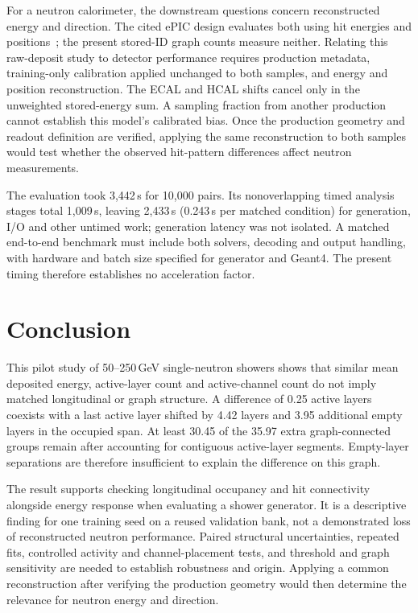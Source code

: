 \documentclass[10pt]{article}
\begin{document}
For a neutron calorimeter, the downstream questions concern reconstructed energy and direction. The cited ePIC design evaluates both using hit energies and positions~\cite{epiczdc}; the present stored-ID graph counts measure neither. Relating this raw-deposit study to detector performance requires production metadata, training-only calibration applied unchanged to both samples, and energy and position reconstruction. The ECAL and HCAL shifts cancel only in the unweighted stored-energy sum. A sampling fraction from another production cannot establish this model's calibrated bias. Once the production geometry and readout definition are verified, applying the same reconstruction to both samples would test whether the observed hit-pattern differences affect neutron measurements.

The evaluation took 3,442\,s for 10,000 pairs. Its nonoverlapping timed analysis stages total 1,009\,s, leaving 2,433\,s (0.243\,s per matched condition) for generation, I/O and other untimed work; generation latency was not isolated. A matched end-to-end benchmark must include both solvers, decoding and output handling, with hardware and batch size specified for generator and Geant4. The present timing therefore establishes no acceleration factor.

\section{Conclusion}

This pilot study of 50--250\,GeV single-neutron showers shows that similar mean deposited energy, active-layer count and active-channel count do not imply matched longitudinal or graph structure. A difference of 0.25 active layers coexists with a last active layer shifted by 4.42 layers and 3.95 additional empty layers in the occupied span. At least 30.45 of the 35.97 extra graph-connected groups remain after accounting for contiguous active-layer segments. Empty-layer separations are therefore insufficient to explain the difference on this graph.

The result supports checking longitudinal occupancy and hit connectivity alongside energy response when evaluating a shower generator. It is a descriptive finding for one training seed on a reused validation bank, not a demonstrated loss of reconstructed neutron performance. Paired structural uncertainties, repeated fits, controlled activity and channel-placement tests, and threshold and graph sensitivity are needed to establish robustness and origin. Applying a common reconstruction after verifying the production geometry would then determine the relevance for neutron energy and direction.
\end{document}

